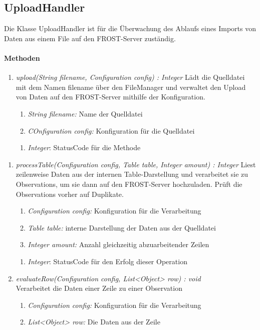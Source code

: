 \subsection{UploadHandler}
\label{uploadHandler}
Die Klasse UploadHandler ist für die Überwachung des Ablaufs eines Imports von Daten aus einem File auf den FROST-Server zuständig.

\paragraph{Methoden}
\begin{enumerate}[+]
\item \textit{upload(String filename, Configuration config) : Integer}
Lädt die Quelldatei mit dem Namen filename über den FileManager und verwaltet den Upload von Daten auf den FROST-Server mithilfe der Konfiguration.
\begin{enumerate}[$\bullet$]
\item \textit{String filename:} Name der Quelldatei
\item \textit{COnfiguration config:} Konfiguration für die Quelldatei 
\end{enumerate}
\vspace{-0.2cm}
\begin{enumerate}[$\circ$]
\item \textit{Integer}: StatusCode für die Methode
\end{enumerate}
\end{enumerate}

\begin{enumerate}[$-$]
\item \textit{processTable(Configuration config, Table table, Integer amount) : Integer} Liest zeilenweise Daten aus der internen Table-Darstellung und verarbeitet sie zu Observations, um sie dann auf den FROST-Server hochzuladen. Prüft die Observations vorher auf Duplikate.
\begin{enumerate}[$\bullet$]
\item \textit{Configuration config:} Konfiguration für die Verarbeitung
\item \textit{Table table:} interne Darstellung der Daten aus der Quelldatei
\item \textit{Integer amount:} Anzahl gleichzeitig abzuarbeitender Zeilen
\end{enumerate}
\vspace{-0.2cm}
\begin{enumerate}[$\circ$]
\item \textit{Integer}: StatusCode für den Erfolg dieser Operation
\end{enumerate}


\item \textit{evaluateRow(Configuration config, List<Object> row) : void}\\
Verarbeitet die Daten einer Zeile zu einer Observation
\begin{enumerate}[$\bullet$]
\item \textit{Configuration config:} Konfiguration für die Verarbeitung
\item \textit{List<Object> row:} Die Daten aus der Zeile
\end{enumerate}
\end{enumerate}